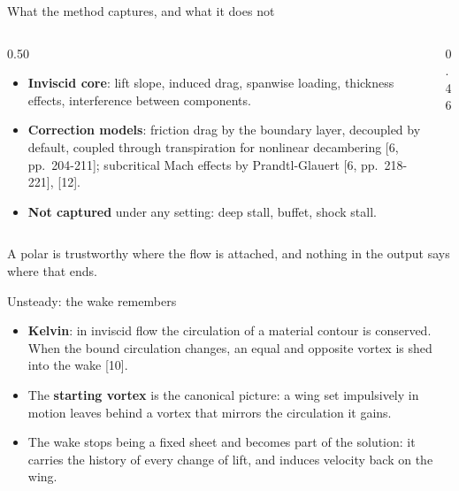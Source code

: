 \begin{frame}{What the method captures, and what it does not}
\begin{columns}[T]
\begin{column}{0.50\textwidth}
\begin{itemize}\small
  \item \textbf{Inviscid core}: lift slope, induced drag, spanwise loading,
        thickness effects, interference between components.
  \item \textbf{Correction models}: friction drag by the boundary layer,
        decoupled by default, coupled through transpiration for nonlinear
        decambering [6, pp.~204-211]; subcritical Mach effects by
        Prandtl-Glauert [6, pp.~218-221], [12].
  \item \textbf{Not captured} under any setting: deep stall, buffet, shock
        stall.
\end{itemize}
\end{column}
\begin{column}{0.46\textwidth}
\end{column}
\end{columns}
\begin{takeaway}A polar is trustworthy where the flow is attached, and nothing
in the output says where that ends.\end{takeaway}
\end{frame}

\begin{frame}{Unsteady: the wake remembers}
\begin{itemize}\small
  \item \textbf{Kelvin}: in inviscid flow the circulation of a material
        contour is conserved. When the bound circulation changes, an equal and
        opposite vortex is shed into the wake [10].
  \item The \textbf{starting vortex} is the canonical picture: a wing set
        impulsively in motion leaves behind a vortex that mirrors the
        circulation it gains.
  \item The wake stops being a fixed sheet and becomes part of the solution:
        it carries the history of every change of lift, and induces velocity
        back on the wing.
\end{itemize}
\end{frame}

